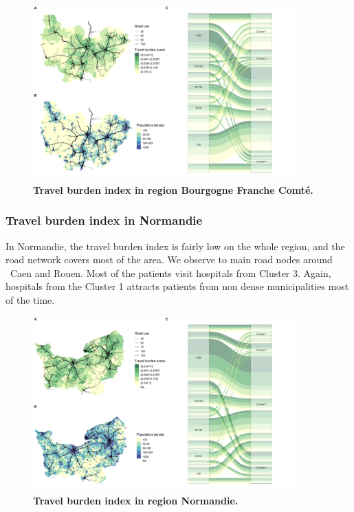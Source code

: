 \begin{figure}[H]
    \includegraphics[width=0.9\textwidth]{images/routes/fig4_27.png}
    \centering
    \caption{
        \textbf{Travel burden index in region Bourgogne Franche Comté.}
    }
    \label{fig:routes-burden-index-bfc}
\end{figure}

\subsubsection{Travel burden index in Normandie}

In Normandie, the travel burden index is fairly low on the whole region, and the
road network covers most of the area. We observe to main road nodes around \
Caen and Rouen. Most of the patients visit hospitals from Cluster 3. Again,
hospitals from the Cluster 1 attracts patients from non dense municipalities
most of the time.

\begin{figure}[H]
    \includegraphics[width=0.9\textwidth]{images/routes/fig4_28.png}
    \centering
    \caption{
        \textbf{Travel burden index in region Normandie.}
    }
    \label{fig:routes-burden-index-normandie}
\end{figure}

